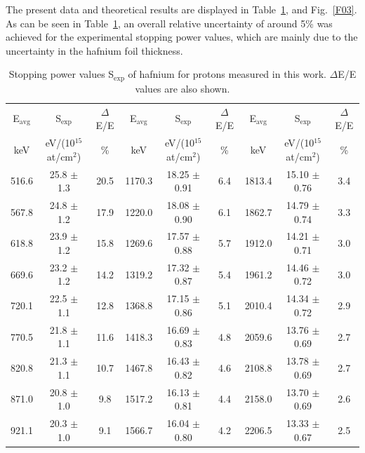 \documentclass[aps,pra,reprint,groupedaddress,showpacs,showkeys]{revtex4-1}
\begin{document}
The present data and theoretical results are displayed in 
Table~\ref{table01}, and Fig.~\ref{F03}. As can be seen in 
Table~\ref{table01}, an overall relative uncertainty of around 5\% was 
achieved for the experimental stopping power values, which are mainly 
due to the uncertainty in the hafnium foil thickness. 

\begin{table}[!t]
\centering
\caption{Stopping power values S$_{\mathrm{exp}}$ of hafnium for protons measured 
in this work. $\Delta$E/E values are also shown.
\label{table01}}

\vspace{0.2cm}

\begin{ruledtabular}
\begin{tabular}{ccc|ccc|ccc} %
E$_{\mathrm{avg}}$ & S$_{\mathrm{exp}}$       & $\Delta$E/E & E$_{\mathrm{avg}}$ & S$_{\mathrm{exp}}$       & $\Delta$E/E & E$_{\mathrm{avg}}$ & S$_{\mathrm{exp}}$       & $\Delta$E/E \\
keV                & eV/(10$^{15}$ at/cm$^2$) & \%          & keV                & eV/(10$^{15}$ at/cm$^2$)	& \%          & keV                & eV/(10$^{15}$ at/cm$^2$) & \% \\ \hline
516.6	 & 25.8	$\pm$	1.3	&	20.5	&	1170.3	&	18.25	$\pm$	0.91	&	6.4	&	1813.4	&	15.10	$\pm$	0.76	&	3.4	\\
567.8	 & 24.8	$\pm$	1.2	&	17.9	&	1220.0	&	18.08	$\pm$	0.90	&	6.1	&	1862.7	&	14.79	$\pm$	0.74	&	3.3	\\
618.8	 & 23.9	$\pm$	1.2	&	15.8	&	1269.6	&	17.57	$\pm$	0.88	&	5.7	&	1912.0	&	14.21	$\pm$	0.71	&	3.0	\\
669.6	 & 23.2	$\pm$	1.2	&	14.2	&	1319.2	&	17.32	$\pm$	0.87	&	5.4	&	1961.2	&	14.46	$\pm$	0.72	&	3.0	\\
720.1	 & 22.5	$\pm$	1.1	&	12.8	&	1368.8	&	17.15	$\pm$	0.86	&	5.1	&	2010.4	&	14.34	$\pm$	0.72	&	2.9	\\
770.5	 & 21.8	$\pm$	1.1	&	11.6	&	1418.3	&	16.69	$\pm$	0.83	&	4.8	&	2059.6	&	13.76	$\pm$	0.69	&	2.7	\\
820.8	 & 21.3	$\pm$	1.1	&	10.7	&	1467.8	&	16.43	$\pm$	0.82	&	4.6	&	2108.8	&	13.78	$\pm$	0.69	&	2.7	\\
871.0	 & 20.8	$\pm$	1.0	&	9.8	&	1517.2	&	16.13	$\pm$	0.81	&	4.4	&	2158.0	&	13.70	$\pm$	0.69	&	2.6	\\
921.1	 & 20.3	$\pm$	1.0	&	9.1	&	1566.7	&	16.04	$\pm$	0.80	&	4.2	&	2206.5	&	13.33	$\pm$	0.67	&	2.5	\\

\end{tabular}
\end{ruledtabular}
\end{table}
\end{document}
